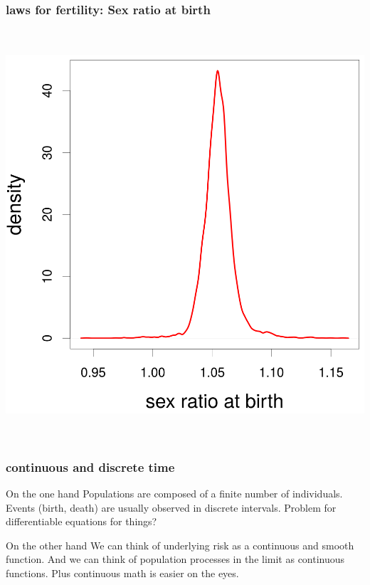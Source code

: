 \documentclass[20pt]{beamer}
\begin{document}
\begin{frame}
\frametitle{laws for fertility: Sex ratio at birth}
\vspace{-2em}
\begin{center}
\includegraphics[height=6in]{Figures/SRB.png}
\end{center}
\end{frame}

\begin{frame}
\frametitle{continuous and discrete time}
\begin{block}{On the one hand}
Populations are composed of a finite number of individuals. Events (birth,
death) are usually observed in discrete intervals. Problem for differentiable
equations for things?
\end{block}
\vspace{1em}
\begin{block}{On the other hand}
We can think of underlying risk as a continuous and smooth function. And we can
think of population processes in the limit as continuous functions. Plus
continuous math is easier on the eyes.
\end{block}
\end{frame}
\end{document}
